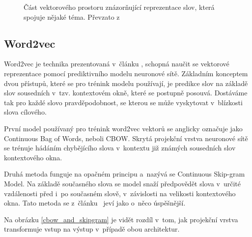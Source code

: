 \begin{figure}[hbt]
	\centering
	\caption{Část vektorového prostoru znázorňující reprezentace slov, která spojuje nějaké téma. Převzato z \cite{online:word_embedds}}
	\label{word_embeddings}
\end{figure}

\subsection{Word2vec}

Word2vec je technika prezentovaná v~článku \cite{mikolov2013embeddings}, schopná naučit se vektorové reprezentace pomocí prediktivního modelu neuronové sítě. Základním konceptem dvou přístupů, které se pro trénink modelu používají, je predikce slov na základě slov sousedních v~tzv. kontextovém okně, které se postupně posouvá. Dostáváme tak pro každé slovo pravděpodobnost, se kterou se může vyskytovat v~blízkosti slova cílového.\par
První model používaný pro trénink word2vec vektorů se anglicky označuje jako Continuous Bag of Words, neboli CBOW. Skrytá projekční vrstva neuronové sítě se trénuje hádáním chybějícího slova v~kontextu již známých sousedních slov kontextového okna.\par
Druhá metoda funguje na opačném principu a~nazývá se Continuous Skip-gram Model. Na základě současného slova se model snaží předpovědět slova v~určité vzdálenosti před i~po současném slově, v~závislosti na velikosti kontextového okna. Tato metoda se z~článku~\cite{mikolov2013embeddings} jeví jako o~něco úspěšnější.\par
Na obrázku \ref{cbow_and_skipgram} je vidět rozdíl v~tom, jak projekční vrstva transformuje vstup na výstup v~případě obou architektur.

